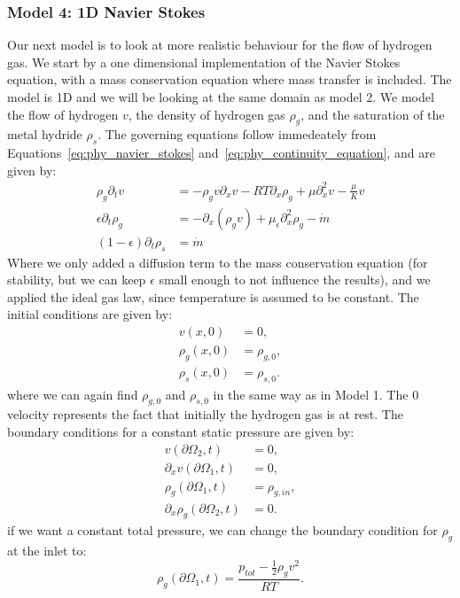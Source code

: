 \subsubsection*{Model 4: 1D Navier Stokes}
Our next model is to look at more realistic behaviour for the flow of hydrogen gas. We start by a one dimensional implementation of the Navier Stokes equation, with a mass conservation equation where mass transfer is included. The model is 1D and we will be looking at the same domain as model 2. We model the flow of hydrogen $v$, the density of hydrogen gas $\rho_g$, and the saturation of the metal hydride $\rho_s$. The governing equations follow immedeately from Equations~\ref{eq:phy_navier_stokes} and~\ref{eq:phy_continuity_equation}, and are given by:
\begin{subequations}\label{eq:phy_model_4}
    \begin{align}
        \rho_g \partial_t v &=-\rho_g v \partial_x v -RT\partial_x\rho_g+\mu\partial_x^2 v - \frac{\mu}{K} v \\
        \epsilon\partial_t\rho_g&=-\partial_x (\rho_g v) + \mu_\epsilon\partial_x^2\rho_g-\dot m \\
        (1-\epsilon)\partial_t \rho_s &= \dot m 
    \end{align}
\end{subequations}
Where we only added a diffusion term to the mass conservation equation (for stability, but we can keep $\epsilon$ small enough to not influence the results), and we applied the ideal gas law, since temperature is assumed to be constant. The initial conditions are given by:
\begin{subequations}\label{eq:phy_model_4_ic}
    \begin{align}
        v(x,0) &= 0, \\
        \rho_g(x,0) &= \rho_{g,0}, \\
        \rho_s(x,0) &= \rho_{s,0}.
    \end{align}
\end{subequations}
where we can again find $\rho_{g,0}$ and $\rho_{s,0}$ in the same way as in Model 1. The $0$ velocity represents the fact that initially the hydrogen gas is at rest. The boundary conditions for a constant static pressure are given by:
\begin{subequations}\label{eq:phy_model_4_bc}
    \begin{align}
        v(\partial\Omega_2,t) &= 0, \\
        \partial_x v(\partial\Omega_1,t) &= 0, \\
        \rho_g(\partial\Omega_1,t) &= \rho_{g,in}, \\
        \partial_x \rho_g(\partial\Omega_2,t) &= 0.
    \end{align}
\end{subequations}
if we want a constant total pressure, we can change the boundary condition for $\rho_g$ at the inlet to:
\begin{equation}
    \rho_g(\partial\Omega_1,t) = \frac{p_{tot}-\frac{1}{2}\rho_g v^2}{RT}.
\end{equation}

